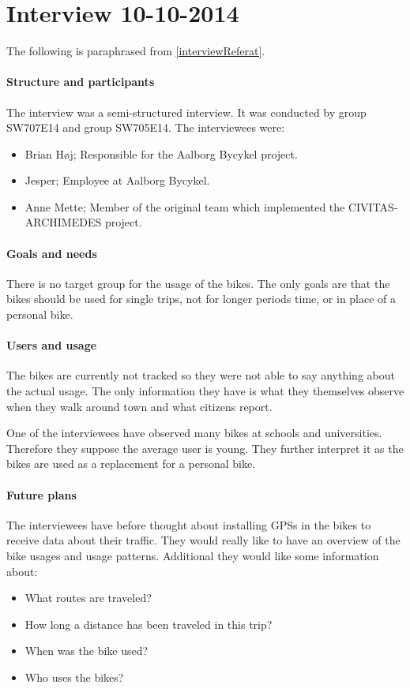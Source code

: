 \section{Interview 10-10-2014}
The following is paraphrased from \cref{interviewReferat}.

\paragraph{Structure and participants}
The interview was a semi-structured interview. 
It was conducted by group SW707E14 and group SW705E14.
The interviewees were:
\begin{itemize}
\item Brian Høj; Responsible for the Aalborg Bycykel project.
\item Jesper; Employee at Aalborg Bycykel.
\item Anne Mette; Member of the original team which implemented the CIVITAS-ARCHIMEDES project.
\end{itemize}


\paragraph{Goals and needs} \label{interview:goals}
There is no target group for the usage of the bikes.
The only goals are that the bikes should be used for single trips, not for longer periods time, or in place of a personal bike.


\paragraph{Users and usage}
The bikes are currently not tracked so they were not able to say anything about the actual usage.
The only information they have is what they themselves observe when they walk around town and what citizens report.

One of the interviewees have observed many bikes at schools and universities.
Therefore they suppose the average user is young.
They further interpret it as the bikes are used as a replacement for a personal bike.


\paragraph{Future plans}
The interviewees have before thought about installing GPSs in the bikes to receive data about their traffic.
They would really like to have an overview of the bike usages and usage patterns.
Additional they would like some information about:
\begin{itemize}
\item What routes are traveled?
\item How long a distance has been traveled in this trip?
\item When was the bike used?
\item Who uses the bikes?
\end{itemize}


